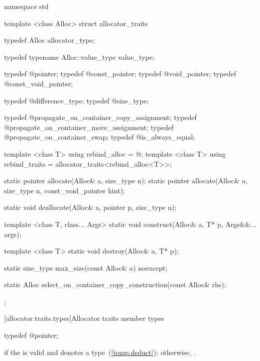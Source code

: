 %
\begin{codeblock}
namespace std {
  template <class Alloc> struct allocator_traits {
    typedef Alloc allocator_type;

    typedef typename Alloc::value_type value_type;

    typedef @\seebelow@ pointer;
    typedef @\seebelow@ const_pointer;
    typedef @\seebelow@ void_pointer;
    typedef @\seebelow@ const_void_pointer;

    typedef @\seebelow@ difference_type;
    typedef @\seebelow@ size_type;

    typedef @\seebelow@ propagate_on_container_copy_assignment;
    typedef @\seebelow@ propagate_on_container_move_assignment;
    typedef @\seebelow@ propagate_on_container_swap;
    typedef @\seebelow@ is_always_equal;

    template <class T> using rebind_alloc = @\seebelow@;
    template <class T> using rebind_traits = allocator_traits<rebind_alloc<T>>;

    static pointer allocate(Alloc& a, size_type n);
    static pointer allocate(Alloc& a, size_type n, const_void_pointer hint);

    static void deallocate(Alloc& a, pointer p, size_type n);

    template <class T, class... Args>
      static void construct(Alloc& a, T* p, Args&&... args);

    template <class T>
      static void destroy(Alloc& a, T* p);

    static size_type max_size(const Alloc& a) noexcept;

    static Alloc select_on_container_copy_construction(const Alloc& rhs);
  };
}
\end{codeblock}

[allocator.traits.types]{Allocator traits member types}

%
%
\begin{itemdecl}
typedef @\seebelow@ pointer;
\end{itemdecl}

\begin{itemdescr}
\pnum
\ctype {} if
the   is valid and denotes a
type~(\ref{temp.deduct}); otherwise, .
\end{itemdescr}

